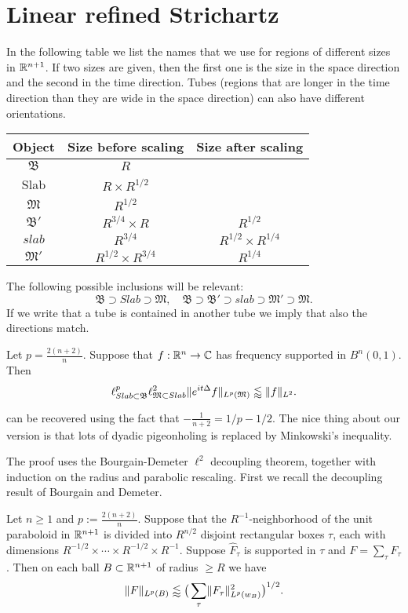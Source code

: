 \documentclass[biblatex]{pzorin-note}
\newcommand{\eit}{e^{i t \Delta}}
\newcommand{\bB}{\mathfrak{B}} %
\newcommand{\bM}{\mathfrak{M}} %
\newcommand{\bBp}{\mathfrak{B}'} %
\newcommand{\bMp}{\mathfrak{M}'} %
\begin{document}
\section{Linear refined Strichartz}
\label{sec:LRS}
In the following table we list the names that we use for regions of different sizes in $\mathbb{R}^{n+1}$.
If two sizes are given, then the first one is the size in the space direction and the second in the time direction.
Tubes (regions that are longer in the time direction than they are wide in the space direction) can also have different orientations.
\begin{center}
\begin{tabular}{ccc} \toprule
  Object & Size before scaling & Size after scaling\\ \midrule
  $\bB$ & $R$ & \\
  Slab & $R \times R^{1/2}$ & \\
  $\bM$ & $R^{1/2}$ & \\
  $\bBp$ & $R^{3/4} \times R$ & $R^{1/2}$\\
  $slab$ & $R^{3/4}$ & $R^{1/2} \times R^{1/4}$\\
  $\bMp$ & $R^{1/2} \times R^{3/4}$ & $R^{1/4}$\\
  \bottomrule
\end{tabular}
\end{center}
The following possible inclusions will be relevant:
\[
\bB \supset Slab \supset \bM, \quad
\bB \supset \bBp \supset slab \supset \bMp \supset \bM.
\]
If we write that a tube is contained in another tube we imply that also the directions match.

\begin{theorem}  \label{thm-LRS}
Let $p = \frac{2(n+2)}{n}$.
Suppose that $f: \mathbb{R}^n \rightarrow \mathbb{C}$ has frequency supported in $B^n(0,1)$.
Then
\begin{equation}
\label{LRS}
\ell^{p}_{Slab \subset \bB} \ell^{2}_{\bM \subset Slab} \norm{ \eit f }_{L^{p}(\bM)}
\lessapprox
\norm{ f }_{L^2}.
\end{equation}
\end{theorem}
\cite[Theorem 3.1]{MR3842310} can be recovered using the fact that $-\frac{1}{n+2} = 1/p - 1/2$.
The nice thing about our version is that lots of dyadic pigeonholing is replaced by Minkowski's inequality.

The proof uses the Bourgain-Demeter $\ell^2$ decoupling theorem, together with induction on the radius and parabolic rescaling.
First we recall the decoupling result of Bourgain and Demeter.
\begin{theorem}[{\cite{MR3374964}}]
\label{bourdem}
Let $n\geq 1$ and $p:=\frac{2(n+2)}{n}$.
Suppose that the $R^{-1}$-neighborhood of the unit paraboloid in
$\mathbb{R}^{n+1}$ is divided into $R^{n/2}$ disjoint rectangular boxes $\tau$, each with dimensions $R^{-1/2}\times\dotsm\times R^{-1/2} \times R^{-1}$.
Suppose $\widehat F_\tau$ is supported in $\tau$ and $F = \sum_\tau F_\tau$.
Then on each ball $B \subset \mathbb{R}^{n+1}$ of radius $\geq R$ we have
\[
\lVert F \rVert_{L^{p}(B)}
\lessapprox
\big( \sum_\tau \lVert F_\tau \rVert_{L^{p}(w_{B})}^2 \big)^{1/2}.
\]
\end{theorem}
\end{document}
